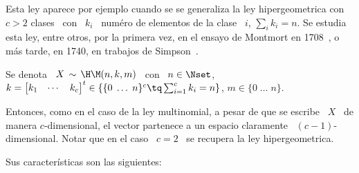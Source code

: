 \label{Sssec:MP:HipergeometricaMultivariada}

Esta ley aparece por ejemplo cuando  se se generaliza la ley hipergeometrica con
$c > 2$ clases \ con \ $k_i$  \ num\'ero de elementos de la clase \ $i$, $\sum_i
k_i = n$.  Se estudia esta ley, entre otros, por la primera vez, en el ensayo de
Montmort  en  1708~\cite{Mon13},  o  m\'as   tarde,  en  1740,  en  trabajos  de
Simpson~\cite{Sim40, Hal90, DavEdw01}.

Se denota \ $X \, \sim \, \H\M(n,k,m)$ \ con \ $\displaystyle n \in \Nset$, \quad
$k = \begin{bmatrix} k_1 & \cdots & k_c\end{bmatrix}^t \in \left\{ \{ 0 \; \ldots
  \; n\}^c  \tq \sum_{i=1}^c k_i  = n \right\}$,  \quad $m \in  \{ 0 \;  \ldots \;
n\}$.

Entonces, como en el caso de la ley multinomial, a pesar de que se escribe \ $X$
\  de manera  $c$-dimensional, el  vector partenece  a un  espacio  claramente \
$(c-1)$-dimensional.  Notar que  en el  caso \  $c  = 2$  \ se  recupera la  ley
hipergeometrica.

Sus caracter\'isticas son las siguientes:

